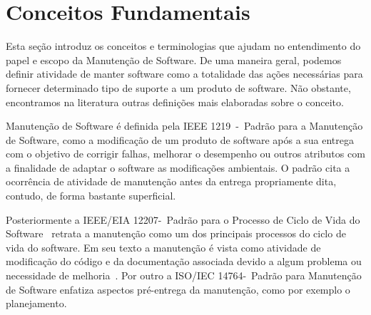 %

\section{Conceitos Fundamentais}
\label{sec:conceitos_basicos}
Esta seção introduz os conceitos e terminologias que ajudam no entendimento do papel e
escopo da Manutenção de Software. De uma maneira geral, podemos definir atividade de manter software
como a totalidade das ações necessárias para fornecer determinado tipo de suporte a um produto de software. 
Não obstante, encontramos na literatura outras definições mais elaboradas sobre o
conceito.

Manutenção de Software é definida pela IEEE 1219~\cite{720567}-~Padrão para a Manutenção de
Software, como a modificação de um produto de software após a sua entrega com o objetivo
de corrigir falhas, melhorar o desempenho ou outros atributos com a finalidade de adaptar o software
as modificações ambientais. O padrão cita a ocorrência de atividade de manutenção antes da entrega
propriamente dita, contudo, de forma bastante superficial.

Posteriormente a IEEE/EIA 12207-~Padrão para o Processo de Ciclo de Vida do Software~\cite{707581}
retrata a manutenção como um dos principais processos do ciclo de vida do software. Em seu texto a
manutenção é vista como atividade de modificação do código e da documentação associada devido a algum problema ou necessidade de melhoria~\cite{4425813}. Por outro a ISO/IEC 14764-~Padrão para
Manutenção de Software enfatiza aspectos pré-entrega da manutenção, como por exemplo o planejamento.

